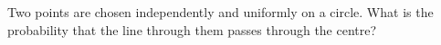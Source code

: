 Two points are chosen independently and uniformly on a circle. What is the probability that the line through them passes through the centre?
